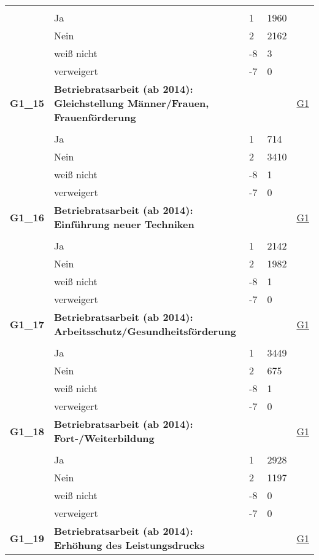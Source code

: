 \begin{longtable}{| L{2.5cm} | L{8.25cm}| C{1.5cm} | R{1.25cm} | C{2.25cm} |  }
   &  &  &  &  \\ 
   & Ja & 1 & 1960 &  \\ 
   & Nein & 2 & 2162 &  \\ 
   & weiß nicht & -8 & 3 &  \\ 
   & verweigert & -7 & 0 &  \\ 
   \midrule
\textbf{G1\_15}\label{var:suf:G1:15} & \textbf{Betriebratsarbeit (ab 2014): Gleichstellung Männer/Frauen, Frauenförderung} &  &  & \hyperref[G1]{G1} \\ 
   &  &  &  &  \\ 
   & Ja & 1 & 714 &  \\ 
   & Nein & 2 & 3410 &  \\ 
   & weiß nicht & -8 & 1 &  \\ 
   & verweigert & -7 & 0 &  \\ 
   \midrule
\textbf{G1\_16}\label{var:suf:G1:16} & \textbf{Betriebratsarbeit (ab 2014): Einführung neuer Techniken} &  &  & \hyperref[G1]{G1} \\ 
   &  &  &  &  \\ 
   & Ja & 1 & 2142 &  \\ 
   & Nein & 2 & 1982 &  \\ 
   & weiß nicht & -8 & 1 &  \\ 
   & verweigert & -7 & 0 &  \\ 
   \midrule
\textbf{G1\_17}\label{var:suf:G1:17} & \textbf{Betriebratsarbeit (ab 2014): Arbeitsschutz/Gesundheitsförderung} &  &  & \hyperref[G1]{G1} \\ 
   &  &  &  &  \\ 
   & Ja & 1 & 3449 &  \\ 
   & Nein & 2 & 675 &  \\ 
   & weiß nicht & -8 & 1 &  \\ 
   & verweigert & -7 & 0 &  \\ 
   \midrule
\textbf{G1\_18}\label{var:suf:G1:18} & \textbf{Betriebratsarbeit (ab 2014): Fort-/Weiterbildung} &  &  & \hyperref[G1]{G1} \\ 
   &  &  &  &  \\ 
   & Ja & 1 & 2928 &  \\ 
   & Nein & 2 & 1197 &  \\ 
   & weiß nicht & -8 & 0 &  \\ 
   & verweigert & -7 & 0 &  \\ 
   \midrule
\textbf{G1\_19}\label{var:suf:G1:19} & \textbf{Betriebratsarbeit (ab 2014): Erhöhung des Leistungsdrucks} &  &  & \hyperref[G1]{G1} \\ 

\end{longtable}
